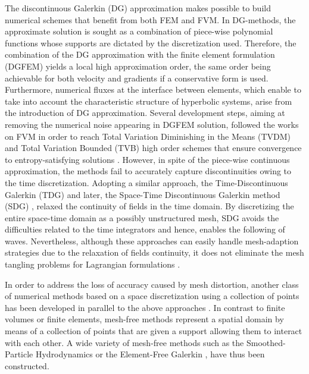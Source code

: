 The discontinuous Galerkin (DG) approximation \cite{NeutronDG} makes possible to build numerical schemes that benefit from both FEM and FVM.
In DG-methods, the approximate solution is sought as a combination of piece-wise polynomial functions whose supports are dictated by the discretization used.
Therefore, the combination of the DG approximation with the finite element formulation (DGFEM) yields a local high approximation order, the same order being achievable for both velocity and gradients if a conservative form is used.
Furthermore, numerical fluxes at the interface between elements, which enable to take into account the characteristic structure of hyperbolic systems, arise from the introduction of DG approximation.
Several development steps, aiming at removing the numerical noise appearing in DGFEM solution, followed the works on FVM in order to reach Total Variation Diminishing in the Means (TVDM) and Total Variation Bounded (TVB) high order schemes that ensure convergence to entropy-satisfying solutions \cite{Cockburn}.
However, in spite of the piece-wise continuous approximation, the methods fail to accurately capture discontinuities owing to the time discretization.
Adopting a similar approach, the Time-Discontinuous Galerkin (TDG) \cite{Hughes_TDG} and later, the Space-Time Discontinuous Galerkin method (SDG) \cite{ST_DGFEM1}, relaxed the continuity of fields in the time domain. 
By discretizing the entire space-time domain as a possibly unstructured mesh, SDG avoids the difficulties related to the time integrators and hence, enables the following of waves.
Nevertheless, although these approaches can easily handle mesh-adaption strategies due to the relaxation of fields continuity, it does not eliminate the mesh tangling problems for Lagrangian formulations \cite{FVilar_DG}.

In order to address the loss of accuracy caused by mesh distortion, another class of numerical methods based on a space discretization using a collection of points has been developed in parallel to the above approaches \cite{Belytschko_Meshless,Meshless}.
In contrast to finite volumes or finite elements, mesh-free methods represent a spatial domain by means of a collection of points that are given a support allowing them to interact with each other.
A wide variety of mesh-free methods such as the Smoothed-Particle Hydrodynamics \cite{SPH} or the Element-Free Galerkin \cite{Belytschko_EFG}, have thus been constructed.

